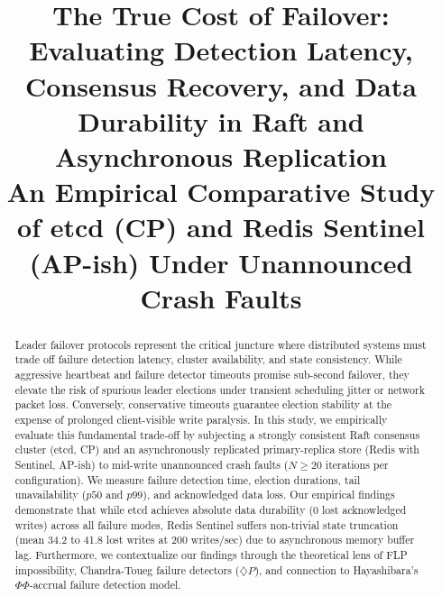 \documentclass[conference]{IEEEtran}
\begin{document}
\title{The True Cost of Failover: Evaluating Detection Latency, Consensus Recovery, and Data Durability in Raft and Asynchronous Replication\\
\large An Empirical Comparative Study of etcd (CP) and Redis Sentinel (AP-ish) Under Unannounced Crash Faults}

\author{
}

\maketitle

\begin{abstract}
Leader failover protocols represent the critical juncture where distributed systems must trade off failure detection latency, cluster availability, and state consistency. While aggressive heartbeat and failure detector timeouts promise sub-second failover, they elevate the risk of spurious leader elections under transient scheduling jitter or network packet loss. Conversely, conservative timeouts guarantee election stability at the expense of prolonged client-visible write paralysis. In this study, we empirically evaluate this fundamental trade-off by subjecting a strongly consistent Raft consensus cluster (etcd, CP) and an asynchronously replicated primary-replica store (Redis with Sentinel, AP-ish) to mid-write unannounced crash faults ($N \ge 20$ iterations per configuration). We measure failure detection time, election durations, tail unavailability ($p50$ and $p99$), and acknowledged data loss. Our empirical findings demonstrate that while etcd achieves absolute data durability (0 lost acknowledged writes) across all failure modes, Redis Sentinel suffers non-trivial state truncation (mean 34.2 to 41.8 lost writes at 200 writes/sec) due to asynchronous memory buffer lag. Furthermore, we contextualize our findings through the theoretical lens of FLP impossibility, Chandra-Toueg failure detectors ($\diamondsuit P$), and connection to Hayashibara's $\Phi$$\Phi$-accrual failure detection model.
\end{abstract}

\end{document}
